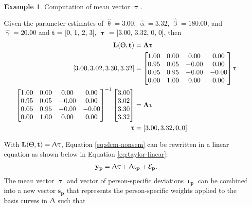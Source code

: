 \documentclass[
12pt, %
twoside,
english]{guelphthesis}
\theoremstyle{definition}
\theoremstyle{definition}
\newtheorem{example}{Example}[chapter]
\theoremstyle{definition}
\theoremstyle{definition}
\theoremstyle{remark}
\begin{document}
\begin{example}
\protect\hypertarget{exm:tau-vector}{}\label{exm:tau-vector}Computation of mean vector \(\mathbf{\uptau}\).

\noindent \textup{Given the parameter estimates of $\hat{\uptheta} = 3.00$, $\hat{\upalpha} = 3.32$, $\hat{\upbeta} = 180.00$, and $\hat{\upgamma} = 20.00$ and $\mathbf{t}$ = [0, 1, 2, 3], $\mathbf{\uptau}$ = [3.00, 3.32, 0, 0], then }
\begin{align*}
\mathbf{L(\Uptheta, t)} &= \mathbf{\Lambda\uptau} \\ 
[3.00, 3.02, 3.30, 3.32] &= \begin{bmatrix}
1.00 & 0.00 & 0.00  & 0.00 \\ 
0.95  & 0.05 & -0.00 & 0.00 \\ 
0.05 & 0.95 & -0.00 & -0.00 \\ 
0.00 & 1.00  & 0.00 & 0.00 \\
\end{bmatrix} \mathbf{\uptau} \\ 
\begin{bmatrix}
1.00 & 0.00 & 0.00  & 0.00 \\ 
0.95  & 0.05 & -0.00 & 0.00 \\ 
0.05 & 0.95 & -0.00 & -0.00 \\ 
0.00 & 1.00  & 0.00 & 0.00 \\
\end{bmatrix}^{-1}
\begin{bmatrix} 
3.00 \\ 3.02 \\ 3.30 \\ 3.32
\end{bmatrix} &=  \mathbf{\Lambda\uptau} \\ 
 \mathbf{\uptau} &= [3.00, 3.32, 0, 0]\\
\end{align*}
\vspace*{-25mm}

\noindent \hrulefill
\end{example}
\noindent With \(\mathbf{L(\Uptheta, t)} = \mathbf{\Uplambda\uptau}\), Equation \ref{eq:slcm-nonsem} can be rewritten in a linear equation as shown below in Equation \ref{eq:taylor-linear}:
\begin{align}
 \mathbf{y_p} = \mathbf{\Uplambda\uptau} + \mathbf{\Uplambda\upiota_p} + \mathbf{\mathcal{E}_p}.
 \label{eq:taylor-linear}
 \end{align}
\noindent The mean vector \(\mathbf{\uptau}\) and vector of
person-specific deviations \(\mathbf{\upiota_p}\) can be combined into a
new vector \(\mathbf{s_p}\) that represents the person-specific weights
applied to the basis curves in \(\mathbf{\Uplambda}\) such that
\end{document}
